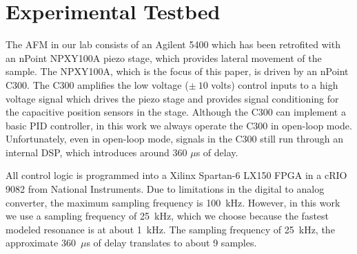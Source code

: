 \documentclass[journal,twocolumn,twoside]{IEEEtran}
\begin{document}




\section{Experimental Testbed}\label{sec:testbed}
The AFM in our lab consists of an Agilent 5400 which has been retrofited with an nPoint NPXY100A piezo stage, which provides lateral movement of the sample. The NPXY100A, which is the focus of this paper, is driven by an nPoint C300. The C300 amplifies the low voltage ($\pm~10$ volts) control inputs to a high voltage signal which drives the piezo stage and provides signal conditioning for the capacitive position sensors in the stage. Although the C300 can implement a basic PID controller, in this work we always operate the C300 in open-loop mode. Unfortunately, even in open-loop mode, signals in the C300 still run through an internal DSP, which introduces around 360 $\mu$s of delay. 

All control logic is programmed into a Xilinx Spartan-6 LX150 FPGA in a cRIO 9082 from National Instruments. Due to limitations in the digital to analog converter, the maximum sampling frequency is 100~kHz. However, in this work we use a sampling frequency of 25~kHz, which we choose because the fastest modeled resonance is at about 1~kHz. The sampling frequency of 25~kHz, the approximate 360~$\mu$s of delay translates to about 9 samples.
\end{document}
